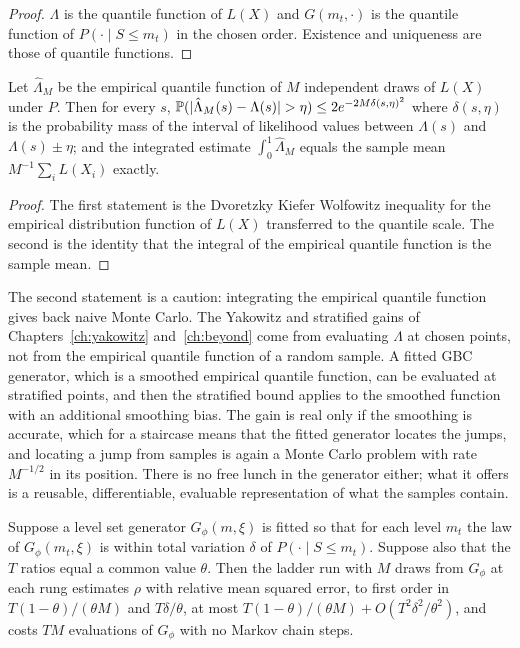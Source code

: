 \begin{proof}
$\Lambda$ is the quantile function of $L(X)$ and $G(m_t, \cdot)$ is the quantile function of $P(\cdot \mid S \le m_t)$ in the chosen order. Existence and uniqueness are those of quantile functions.
\end{proof}

\begin{theorem}[Estimation]
Let $\hat\Lambda_M$ be the empirical quantile function of $M$ independent draws of $L(X)$ under $P$. Then for every $s$, $\mathbb{P}( |\hat\Lambda_M(s) - \Lambda(s)| > \eta ) \le 2 e^{-2 M \delta(s, \eta)^2}$ where $\delta(s, \eta)$ is the probability mass of the interval of likelihood values between $\Lambda(s)$ and $\Lambda(s) \pm \eta$; and the integrated estimate $\int_0^1 \hat\Lambda_M$ equals the sample mean $M^{-1} \sum_i L(X_i)$ exactly.
\end{theorem}

\begin{proof}
The first statement is the Dvoretzky Kiefer Wolfowitz inequality for the empirical distribution function of $L(X)$ transferred to the quantile scale. The second is the identity that the integral of the empirical quantile function is the sample mean.
\end{proof}

The second statement is a caution: integrating the empirical quantile function gives back naive Monte Carlo. The Yakowitz and stratified gains of Chapters~\ref{ch:yakowitz} and~\ref{ch:beyond} come from evaluating $\Lambda$ at chosen points, not from the empirical quantile function of a random sample. A fitted GBC generator, which is a smoothed empirical quantile function, can be evaluated at stratified points, and then the stratified bound applies to the smoothed function with an additional smoothing bias. The gain is real only if the smoothing is accurate, which for a staircase means that the fitted generator locates the jumps, and locating a jump from samples is again a Monte Carlo problem with rate $M^{-1/2}$ in its position. There is no free lunch in the generator either; what it offers is a reusable, differentiable, evaluable representation of what the samples contain.

\begin{theorem}
\label{thm:amortised}
Suppose a level set generator $G_\phi(m, \xi)$ is fitted so that for each level $m_t$ the law of $G_\phi(m_t, \xi)$ is within total variation $\delta$ of $P(\cdot \mid S \le m_t)$. Suppose also that the $T$ ratios equal a common value $\theta$. Then the ladder run with $M$ draws from $G_\phi$ at each rung estimates $\rho$ with relative mean squared error, to first order in $T(1 - \theta)/(\theta M)$ and $T\delta/\theta$, at most $T(1 - \theta)/(\theta M) + O(T^2 \delta^2/\theta^2)$, and costs $T M$ evaluations of $G_\phi$ with no Markov chain steps.
\end{theorem}

